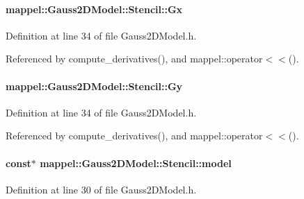 \paragraph[{\texorpdfstring{Gx}{Gx}}]{ mappel\+::\+Gauss2\+D\+Model\+::\+Stencil\+::\+Gx}\hypertarget{classmappel_1_1Gauss2DModel_1_1Stencil_a5fa2dbc0d5f95d6e2df63984927b3932}{}\label{classmappel_1_1Gauss2DModel_1_1Stencil_a5fa2dbc0d5f95d6e2df63984927b3932}


Definition at line 34 of file Gauss2\+D\+Model.\+h.



Referenced by compute\+\_\+derivatives(), and mappel\+::operator$<$$<$().

\paragraph[{\texorpdfstring{Gy}{Gy}}]{ mappel\+::\+Gauss2\+D\+Model\+::\+Stencil\+::\+Gy}\hypertarget{classmappel_1_1Gauss2DModel_1_1Stencil_abe22fdce34e3532fd33aa169aa68de56}{}\label{classmappel_1_1Gauss2DModel_1_1Stencil_abe22fdce34e3532fd33aa169aa68de56}


Definition at line 34 of file Gauss2\+D\+Model.\+h.



Referenced by compute\+\_\+derivatives(), and mappel\+::operator$<$$<$().

\paragraph[{\texorpdfstring{model}{model}}]{ const$\ast$ mappel\+::\+Gauss2\+D\+Model\+::\+Stencil\+::model}\hypertarget{classmappel_1_1Gauss2DModel_1_1Stencil_ac5ae33e358a883887bccedc8a485bca7}{}\label{classmappel_1_1Gauss2DModel_1_1Stencil_ac5ae33e358a883887bccedc8a485bca7}


Definition at line 30 of file Gauss2\+D\+Model.\+h.



